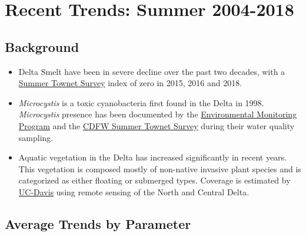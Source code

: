 \documentclass[
]{book}
\providecommand{\tightlist}{%
  \setlength{\itemsep}{0pt}\setlength{\parskip}{0pt}}
\begin{document}
\hypertarget{recent-trends-summer-2004-2018}{%
\section{Recent Trends: Summer 2004-2018}\label{recent-trends-summer-2004-2018}}

\hypertarget{background-5}{%
\subsection{Background}\label{background-5}}

\begin{itemize}
\tightlist
\item
  Delta Smelt have been in severe decline over the past two decades, with a \href{https://wildlife.ca.gov/Conservation/Delta/Townet-Survey}{Summer Townet Survey} index of zero in 2015, 2016 and 2018.
\item
  \emph{Microcystis} is a toxic cyanobacteria first found in the Delta in 1998. \emph{Microcystis} presence has been documented by the \href{https://emp.baydeltalive.com/wiki/12297}{Environmental Monitoring Program} and the \href{https://wildlife.ca.gov/Conservation/Delta/Townet-Survey}{CDFW Summer Townet Survey} during their water quality sampling.
\item
  Aquatic vegetation in the Delta has increased significantly in recent years. This vegetation is composed mostly of non-native invasive plant species and is categorized as either floating or submerged types. Coverage is estimated by \href{http://cstars.metro.ucdavis.edu/}{UC-Davis} using remote sensing of the North and Central Delta.
\end{itemize}

\hypertarget{average-trends-by-parameter}{%
\subsection{Average Trends by Parameter}\label{average-trends-by-parameter}}
\end{document}
